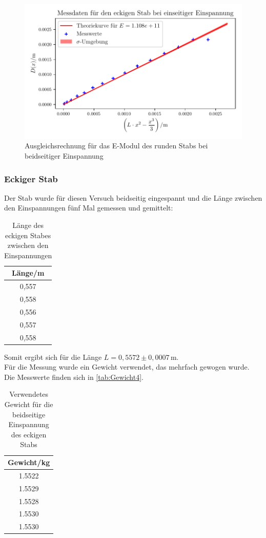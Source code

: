   \begin{figure}
    \centering
    \includegraphics{build/plot3.pdf}
    \caption{Ausgleichsrechnung für das E-Modul des runden Stabs bei beidseitiger Einspannung}
    \label{fig:Messwerte3}
  \end{figure}
  \newpage

\subsubsection{Eckiger Stab}
  Der Stab wurde für diesen Versuch beidseitig eingespannt und die Länge zwischen den Einspannungen fünf Mal gemessen und gemittelt:

  \begin{table}
    \centering
    \caption{Länge des eckigen Stabes zwischen den Einspannungen}
    \label{tab:beidseitig_eckiger_Laenge}
    \begin{tabular}{c}
      \toprule
      Länge/m \\
      \midrule
      0,557 \\
      0,558 \\
      0,556 \\
      0,557 \\
      0,558 \\
      \bottomrule
    \end{tabular}
  \end{table}

  Somit ergibt sich für die Länge $L = 0{,}5572 \pm 0,0007 \, \mathrm{m}$.\\

  Für die Messung wurde ein Gewicht verwendet, das mehrfach gewogen wurde. Die Messwerte finden sich in \autoref{tab:Gewicht4}.

  \begin{table}
    \centering
    \caption{Verwendetes Gewicht für die beidseitige Einspannung des eckigen Stabs}
    \label{tab:Gewicht4}
    \begin{tabular}{c}
      \toprule
      Gewicht/kg \\
      \midrule
      1.5522\\
      1.5529 \\
      1.5528 \\
      1.5530 \\
      1.5530  \\
      \bottomrule
    \end{tabular}
  \end{table}


